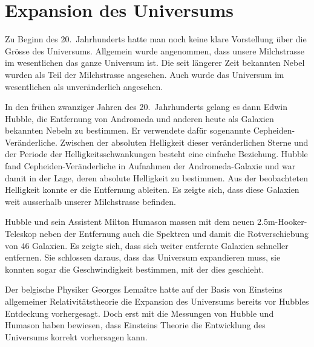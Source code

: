 \section{Expansion des Universums}
Zu Beginn des 20.~Jahrhunderts hatte man noch keine klare Vorstellung
über die Grösse des Universums.
Allgemein wurde angenommen, dass unsere Milchstrasse im wesentlichen das
ganze Universum ist.
Die seit längerer Zeit bekannten Nebel wurden als Teil der Milchstrasse
angesehen.
Auch wurde das Universum im wesentlichen als unveränderlich angesehen.

In den frühen zwanziger Jahren des 20.~Jahrhunderts gelang es dann
Edwin Hubble, die Entfernung von Andromeda und anderen heute als
Galaxien bekannten Nebeln zu bestimmen.
Er verwendete dafür sogenannte Cepheiden-Veränderliche.
Zwischen der absoluten Helligkeit dieser veränderlichen
Sterne und der Periode der Helligkeitsschwankungen besteht
eine einfache Beziehung.
Hubble fand Cepheiden-Veränderliche in Aufnahmen der Andromeda-Galaxie
und war damit in der Lage, deren absolute Helligkeit zu bestimmen.
Aus der beobachteten Helligkeit konnte er die Entfernung ableiten.
Es zeigte sich, dass diese Galaxien weit ausserhalb unserer Milchstrasse
befinden.

Hubble und sein Assistent Milton Humason massen mit dem neuen
2.5m-Hooker-Teleskop neben der Entfernung auch die Spektren und
damit die Rotverschiebung von 46 Galaxien.
Es zeigte sich, dass sich weiter entfernte Galaxien schneller 
entfernen.
Sie schlossen daraus, dass das Universum expandieren muss, sie konnten
sogar die Geschwindigkeit bestimmen, mit der dies geschieht.

Der belgische Physiker
Georges Lemaître hatte auf der Basis von Einsteins allgemeiner
Relativitätstheorie die Expansion des Universums bereits vor
Hubbles Entdeckung vorhergesagt.
Doch erst mit die Messungen von Hubble und Humason haben bewiesen,
dass Einsteins Theorie die Entwicklung des Universums korrekt
vorhersagen kann.

